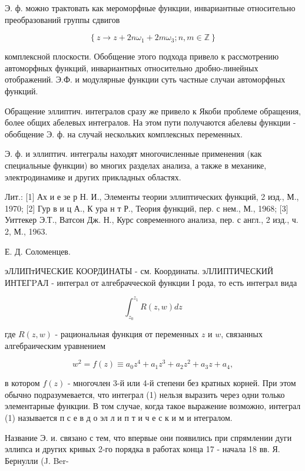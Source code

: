 \documentclass[10pt]{article}
\begin{document}
Э. ф. можно трактовать как мероморфные функции, инвариантные относительно преобразований группы сдвигов



\[

\left\{z \rightarrow z+2 n \omega_{1}+2 m \omega_{3} ; n, m \in \mathbb{Z}\right\}

\]



комплексной плоскости. Обобщение этого подхода привело к рассмотрению автоморфных функций, инвариантных относительно дробно-линейных отображений. Э.Ф. и модулярные функции суть частные случаи автоморфных функций.



Обращение эллиптич. интегралов сразу же привело к Якоби проблеме обращения, более общих абелевых интегралов. На этом пути получаются абелевы функции - обобщение Э. ф. на случай нескольких комплексных переменных.



Э. ф. и эллиптич. интегралы находят многочисленные применения (как специальные функции) во многих разделах анализа, а также в механике, электродинамике и других прикладных областях.



Лит.: [1] Ах и е зе р Н. И., Элементы теории эллиптических функций, 2 изд., М., 1970; [2] Гур в и ц А., К ура н т Р., Теория функций, пер. с нем., М., 1968; [3] Уиттекер Э.Т., Ватсон Дж. Н., Курс современного анализа, пер. с англ., 2 изд., ч. 2, М., 1963.



Е. Д. Соломенцев.



эЛЛИПтИЧЕСКИЕ КООРДИНАТЫ - см. Координаты. эЛЛИПТИЧЕСКИЙ ИНТЕГPАЛ - интеграл от алгебрачческой функции І рода, то есть интеграл вида



\[

\int_{z_{0}}^{z_{1}} R(z, w) d z

\]



где $R(z, w)$ - рациональная функция от переменных $z$ и $w$, связанных алгебраическим уравнением



\[

w^{2}=f(z) \equiv a_{0} z^{4}+a_{1} z^{3}+a_{2} z^{2}+a_{3} z+a_{4},

\]



в котором $f(z)$ - многочлен 3-й или 4-й степени без кратных корней. При этом обычно подразумевается, что интеграл (1) нельзя выразить через одни только элементарные функции. В том случае, когда такое выражение возможно, интеграл (1) называется п с е в д о эл л и п т и ч е с к и м и нтегралом.



Название Э. и. связано с тем, что впервые они появились при спрямлении дуги эллипса и других кривых 2-го порядка в работах конца 17 - начала 18 вв. Я. Бернулли (J. Ber-
\end{document}
